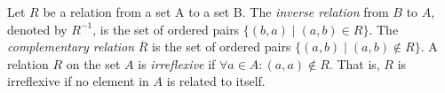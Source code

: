 \documentclass[addpoints]{exam}
\newcommand\interx\cap
\begin{document}
\begin{questions}
  \begin{solution}
    \begin{parts}
    \part
    \part
    \part
    \part
    \part
    \end{parts}    
  \end{solution}

  \begin{EnvUplevel}
    Let $R$ be a relation from a set A to a set B. The \textit{inverse relation} from $B$ to $A$, denoted by $R^{-1}$, is the set of ordered pairs $\{(b, a) \mid (a, b) \in R\}$. The \textit{complementary relation} $\overline{R}$ is the set of ordered pairs $\{(a, b) \mid (a, b) \not\in R\}$. A relation $R$ on the set $A$ is \textit{irreflexive} if $\forall a \in A\colon (a, a) \not\in R$. That is, $R$ is irreflexive if no element in $A$ is related to itself.
  \end{EnvUplevel}


\end{questions}
\end{document}
